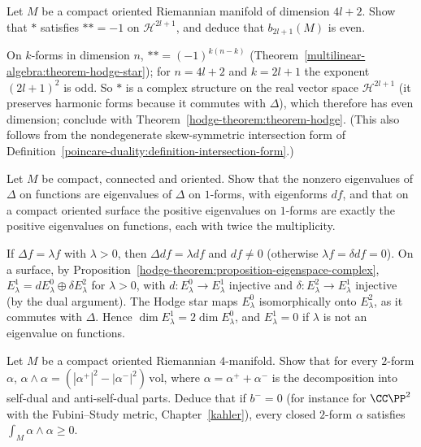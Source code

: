 \begin{exercise}\label{hodge-theorem:exercise-odd-dimension-signature}
Let $M$ be a compact oriented Riemannian manifold of dimension $4l + 2$. Show that $*$ satisfies $** = -1$ on $\mathcal{H}^{2l+1}$, and deduce that $b_{2l+1}(M)$ is even.
\end{exercise}

\begin{solution}
On $k$-forms in dimension $n$, $** = (-1)^{k(n-k)}$ (Theorem~\ref{multilinear-algebra:theorem-hodge-star}); for $n = 4l + 2$ and $k = 2l + 1$ the exponent $(2l + 1)^2$ is odd. So $*$ is a complex structure on the
real vector space $\mathcal{H}^{2l+1}$ (it preserves harmonic forms because it commutes with $\Delta$), which therefore has even dimension; conclude with Theorem~\ref{hodge-theorem:theorem-hodge}. (This also follows
from the nondegenerate skew-symmetric intersection form of Definition~\ref{poincare-duality:definition-intersection-form}.)
\end{solution}

\begin{exercise}\label{hodge-theorem:exercise-eigenvalue-one-forms}
Let $M$ be compact, connected and oriented. Show that the nonzero eigenvalues of $\Delta$ on functions are eigenvalues of $\Delta$ on $1$-forms, with eigenforms $df$, and that on a compact oriented surface the
positive eigenvalues on $1$-forms are exactly the positive eigenvalues on functions, each with twice the multiplicity.
\end{exercise}

\begin{solution}
If $\Delta f = \lambda f$ with $\lambda > 0$, then $\Delta df = \lambda df$ and $df \neq 0$ (otherwise $\lambda f = \delta df = 0$). On a surface, by Proposition~\ref{hodge-theorem:proposition-eigenspace-complex},
$E^1_\lambda = dE^0_\lambda \oplus \delta E^2_\lambda$ for $\lambda > 0$, with $d \colon E^0_\lambda \to E^1_\lambda$ injective and $\delta \colon E^2_\lambda \to E^1_\lambda$ injective (by the dual argument). The Hodge star maps
$E^0_\lambda$ isomorphically onto $E^2_\lambda$, as it commutes with $\Delta$. Hence $\dim E^1_\lambda = 2\dim E^0_\lambda$, and $E^1_\lambda = 0$ if $\lambda$ is not an eigenvalue on functions.
\end{solution}

\begin{exercise}\label{hodge-theorem:exercise-self-dual-cp2}
Let $M$ be a compact oriented Riemannian $4$-manifold. Show that for every $2$-form $\alpha$, $\alpha \wedge \alpha = (|\alpha^+|^2 - |\alpha^-|^2)\,\mathrm{vol}$, where $\alpha = \alpha^+ + \alpha^-$ is the decomposition into
self-dual and anti-self-dual parts. Deduce that if $b^- = 0$ (for instance for $\CC\PP^2$ with the Fubini--Study metric, Chapter~\ref{kahler}), every closed $2$-form $\alpha$ satisfies $\int_M\alpha \wedge \alpha \geq 0$.
\end{exercise}

